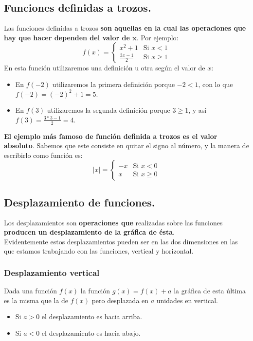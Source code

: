 \documentclass[a4paper,11pt,answers]{exam}
\begin{document}
\subsection{Funciones definidas a trozos.}
Las funciones definidas a trozos \textbf{son aquellas en la cual las operaciones que hay que hacer dependen del valor de $\boldsymbol{x}$}. Por ejemplo:
\[f(x) = \left\lbrace \begin{array}{ll}
	x^2 + 1 &\text{Si } x < 1\\
	\frac{3x -1}{2}&\text{Si } x \geq 1
\end{array} \right.\]
En esta función utilizaremos una definición u otra según el valor de $x$:
\begin{itemize}
	\item En $f(-2)$ utilizaremos la primera definición porque $-2<1$, con lo que $f(-2) = (-2)^2 + 1 = 5$.
	\item En $f(3)$ utilizaremos la segunda definición porque $3 \geq 1$, y así $f(3) = \frac{3*3 -1}{2} = 4$.
\end{itemize}

\textbf{El ejemplo más famoso de función definida a trozos es el valor absoluto}. Sabemos que este consiste en quitar el signo al número, y la manera de escribirlo como función es:
\[|x| = \left\lbrace \begin{array}{rl}
	-x &\text{Si } x < 0\\
	x&\text{Si } x \geq 0
\end{array} \right.\]

\subsection{Desplazamiento de funciones.}
Los desplazamientos son \textbf{operaciones que} realizadas sobre las funciones \textbf{producen un desplazamiento de la gráfica de ésta}.\\
Evidentemente estos desplazamientos pueden ser en las dos dimensiones en las que estamos trabajando con las funciones, vertical y horizontal.
\subsubsection{Desplazamiento vertical}
Dada una función $f(x)$ la función $g(x) = f(x) +a$ la gráfica de esta última es la misma que la de $f(x)$ pero desplazada en $a$ unidades en vertical.
\begin{itemize}
	\item Si $a>0$ el desplazamiento es hacia arriba.
	\item Si $a<0$ el desplazamiento es hacia abajo.
\end{itemize}
\end{document}
